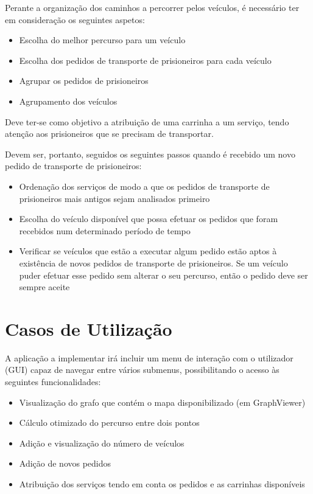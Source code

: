 \documentclass[article, a4paper, 12pt, oneside]{memoir}
\begin{document}
Perante a organização dos caminhos a percorrer pelos veículos, é necessário ter em consideração os seguintes aspetos:

\begin{itemize}
	\item Escolha do melhor percurso para um veículo
	\item Escolha dos pedidos de transporte de prisioneiros para cada veículo
	\item Agrupar os pedidos de prisioneiros
	\item Agrupamento dos veículos
\end{itemize}

Deve ter-se como objetivo a atribuição de uma carrinha a um serviço, tendo atenção aos prisioneiros que se precisam de transportar.

Devem ser, portanto, seguidos os seguintes passos quando é recebido um novo pedido de transporte de prisioneiros:

\begin{itemize}
	\item Ordenação dos serviços de modo a que os pedidos de transporte de prisioneiros mais antigos sejam analisados primeiro
	\item Escolha do veículo disponível que possa efetuar os pedidos que foram recebidos num determinado período de tempo
	\item Verificar se veículos que estão a executar algum pedido estão aptos à existência de novos pedidos de transporte de prisioneiros. Se um veículo puder efetuar esse pedido sem alterar o seu percurso, então o pedido deve ser sempre aceite
\end{itemize}

\section{Casos de Utilização}

A aplicação a implementar irá incluir um menu de interação com o utilizador (GUI) capaz de navegar entre vários submenus, possibilitando o acesso às seguintes funcionalidades:

\begin{itemize}
	\item Visualização do grafo que contém o mapa disponibilizado (em GraphViewer)
	\item Cálculo otimizado do percurso entre dois pontos
	\item Adição e visualização do número de veículos
	\item Adição de novos pedidos
	\item Atribuição dos serviços tendo em conta os pedidos e as carrinhas disponíveis
\end{itemize}
\end{document}

